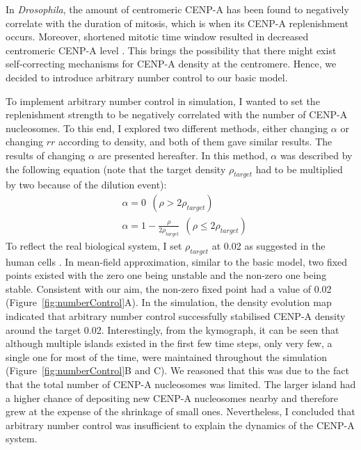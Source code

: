 In \textit{Drosophila}, the amount of centromeric CENP-A has been found to negatively correlate with the duration of mitosis, which is when its CENP-A replenishment occurs. Moreover, shortened mitotic time window resulted in decreased centromeric CENP-A level \citep{Pauleau2019TheCells}. This brings the possibility that there might exist self-correcting mechanisms for CENP-A density at the centromere. Hence, we decided to introduce arbitrary number control to our basic model. 

To implement arbitrary number control in simulation, I wanted to set the replenishment strength to be negatively correlated with the number of CENP-A nucleosomes. To this end, I explored two different methods, either changing $\alpha$ or changing $rr$ according to density, and both of them gave similar results. The results of changing $\alpha$ are presented hereafter. In this method, $\alpha$ was described by the following equation (note that the target density $\rho_{target}$ had to be multiplied by two because of the dilution event):
\begin{equation}\label{eq:8}
\begin{split}
        & \alpha = 0 \:\: (\rho > 2\rho_{target}) \\
        & \alpha = 1 - \frac{\rho}{2\rho_{target}} \:\: (\rho \le 2\rho_{target})
\end{split}
\end{equation}
To reflect the real biological system, I set $\rho_{target}$ at 0.02 as suggested in the human cells \citep{Bodor2014}. In mean-field approximation, similar to the basic model, two fixed points existed with the zero one being unstable and the non-zero one being stable. Consistent with our aim, the non-zero fixed point had a value of 0.02 (Figure~\ref{fig:numberControl}A). In the simulation, the density evolution map indicated that arbitrary number control successfully stabilised CENP-A density around the target 0.02. Interestingly, from the kymograph, it can be seen that although multiple islands existed in the first few time steps, only very few, a single one for most of the time, were maintained throughout the simulation (Figure~\ref{fig:numberControl}B and C). We reasoned that this was due to the fact that the total number of CENP-A nucleosomes was limited. The larger island had a higher chance of depositing new CENP-A nucleosomes nearby and therefore grew at the expense of the shrinkage of small ones. Nevertheless, I concluded that arbitrary number control was insufficient to explain the dynamics of the CENP-A system. 

